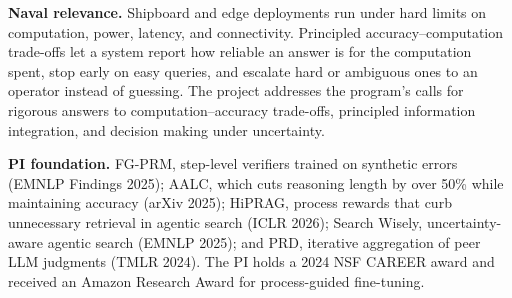 \documentclass[11pt]{article}
\newcommand{\head}[1]{{\color{navy}\textbf{#1}}\enspace}
\begin{document}
\head{Naval relevance.} Shipboard and edge deployments run under hard limits on computation, power, latency, and connectivity. Principled accuracy--computation trade-offs let a system report how reliable an answer is for the computation spent, stop early on easy queries, and escalate hard or ambiguous ones to an operator instead of guessing. The project addresses the program's calls for rigorous answers to computation--accuracy trade-offs, principled information integration, and decision making under uncertainty.

\head{PI foundation.} FG-PRM, step-level verifiers trained on synthetic errors (EMNLP Findings 2025); AALC, which cuts reasoning length by over 50\% while maintaining accuracy (arXiv 2025); HiPRAG, process rewards that curb unnecessary retrieval in agentic search (ICLR 2026); Search Wisely, uncertainty-aware agentic search (EMNLP 2025); and PRD, iterative aggregation of peer LLM judgments (TMLR 2024). The PI holds a 2024 NSF CAREER award and received an Amazon Research Award for process-guided fine-tuning.
\end{document}
